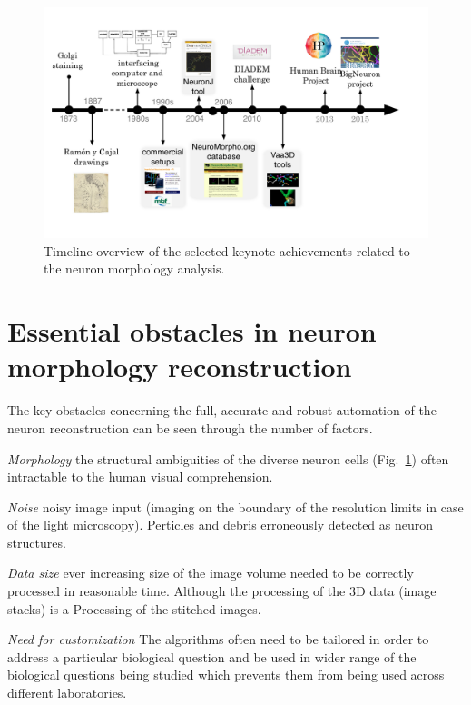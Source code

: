 \begin{figure}
	\begin{center}
		\includegraphics[width=\textwidth]{ch1_fig1}
	\end{center}
	\vspace{-3ex}
	\caption{Timeline overview of the selected keynote achievements related to the neuron morphology analysis.}
	\vspace{-1ex}
	\label{ch1__fig1}
\end{figure}

\section{Essential obstacles in neuron morphology reconstruction}
The key obstacles concerning the full, accurate and robust automation of the neuron reconstruction \cite{meijering2010neuron,donohue2011automated,acciai2016automated} can be seen through the number of factors.

\textit{Morphology} the structural ambiguities of the diverse neuron cells (Fig.~\ref{}) often intractable to the human visual comprehension.

\textit{Noise} noisy image input (imaging on the boundary of the resolution limits in case of the light microscopy). Perticles and debris erroneously detected as neuron structures.

\textit{Data size} ever increasing size of the image volume needed to be correctly processed in reasonable time. Although the processing of the 3D data (image stacks) is a  Processing of the stitched images.

\textit{Need for customization} The algorithms often need to be tailored in order to address a particular biological question and be used in wider range of the biological questions being studied which prevents them from being used across different laboratories.

